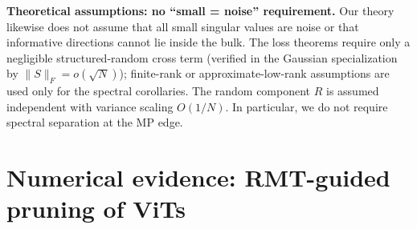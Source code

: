 \documentclass[11pt]{article}
\theoremstyle{plain}
\theoremstyle{definition}
\theoremstyle{remark}
\newcommand{\1}{\mathbf{1}}
\begin{document}
\noindent\textbf{Theoretical assumptions: no ``small = noise'' requirement.}
Our theory likewise does not assume that all small singular values are noise or that informative directions cannot lie inside the bulk. The loss theorems require only a negligible structured-random cross term (verified in the Gaussian specialization by \(\|S\|_F=o(\sqrt N)\)); finite-rank or approximate-low-rank assumptions are used only for the spectral corollaries. The random component \(R\) is assumed independent with variance scaling \(O(1/N)\). In particular, we do not require spectral separation at the MP edge.

\section{Numerical evidence: RMT-guided pruning of ViTs}
\label{sec:pruning_VITs}
\end{document}
